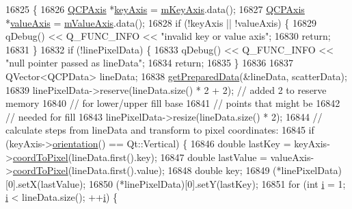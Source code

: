 \begin{DoxyCode}
16825                                                                           \{
16826   \hyperlink{class_q_c_p_axis}{QCPAxis} *\hyperlink{class_q_c_p_abstract_plottable_a72c7a09c22963f2c943f07112b311103}{keyAxis} = \hyperlink{class_q_c_p_abstract_plottable_a426f42e254d0f8ce5436a868c61a6827}{mKeyAxis}.data();
16827   \hyperlink{class_q_c_p_axis}{QCPAxis} *\hyperlink{class_q_c_p_abstract_plottable_a3106f9d34d330a6097a8ec5905e5b519}{valueAxis} = \hyperlink{class_q_c_p_abstract_plottable_a2901452ca4aea911a1827717934a4bda}{mValueAxis}.data();
16828   \textcolor{keywordflow}{if} (!keyAxis || !valueAxis) \{
16829     qDebug() << Q\_FUNC\_INFO << \textcolor{stringliteral}{"invalid key or value axis"};
16830     \textcolor{keywordflow}{return};
16831   \}
16832   \textcolor{keywordflow}{if} (!linePixelData) \{
16833     qDebug() << Q\_FUNC\_INFO << \textcolor{stringliteral}{"null pointer passed as lineData"};
16834     \textcolor{keywordflow}{return};
16835   \}
16836 
16837   QVector<QCPData> lineData;
16838   \hyperlink{class_q_c_p_graph_ab420b46ba638dc3252439fe16687b244}{getPreparedData}(&lineData, scatterData);
16839   linePixelData->reserve(lineData.size() * 2 + 2); \textcolor{comment}{// added 2 to reserve memory}
16840                                                    \textcolor{comment}{// for lower/upper fill base}
16841                                                    \textcolor{comment}{// points that might be}
16842                                                    \textcolor{comment}{// needed for fill}
16843   linePixelData->resize(lineData.size() * 2);
16844   \textcolor{comment}{// calculate steps from lineData and transform to pixel coordinates:}
16845   \textcolor{keywordflow}{if} (keyAxis->\hyperlink{class_q_c_p_axis_a57483f2f60145ddc9e63f3af53959265}{orientation}() == Qt::Vertical) \{
16846     \textcolor{keywordtype}{double} lastKey = keyAxis->\hyperlink{class_q_c_p_axis_a985ae693b842fb0422b4390fe36d299a}{coordToPixel}(lineData.first().key);
16847     \textcolor{keywordtype}{double} lastValue = valueAxis->\hyperlink{class_q_c_p_axis_a985ae693b842fb0422b4390fe36d299a}{coordToPixel}(lineData.first().value);
16848     \textcolor{keywordtype}{double} key;
16849     (*linePixelData)[0].setX(lastValue);
16850     (*linePixelData)[0].setY(lastKey);
16851     \textcolor{keywordflow}{for} (\textcolor{keywordtype}{int} \hyperlink{_comparision_pictures_2_createtest_image_8m_a6f6ccfcf58b31cb6412107d9d5281426}{i} = 1; \hyperlink{_comparision_pictures_2_createtest_image_8m_a6f6ccfcf58b31cb6412107d9d5281426}{i} < lineData.size(); ++\hyperlink{_comparision_pictures_2_createtest_image_8m_a6f6ccfcf58b31cb6412107d9d5281426}{i}) \{

\end{DoxyCode}
